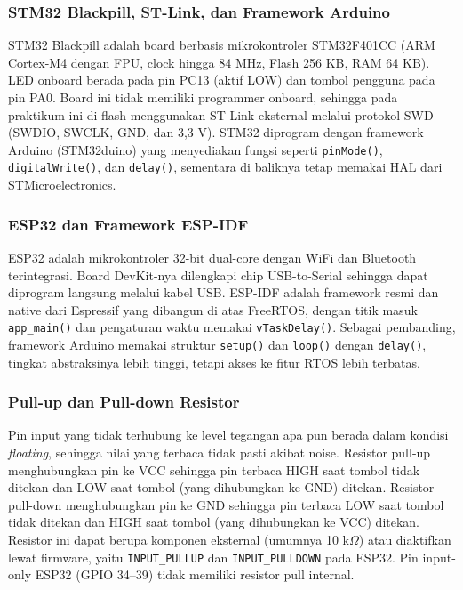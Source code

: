\subsubsection{STM32 Blackpill, ST-Link, dan Framework Arduino}
STM32 Blackpill adalah board berbasis mikrokontroler STM32F401CC (ARM Cortex-M4 dengan FPU, clock hingga 84 MHz, Flash 256 KB, RAM 64 KB). LED onboard berada pada pin PC13 (aktif LOW) dan tombol pengguna pada pin PA0. Board ini tidak memiliki programmer onboard, sehingga pada praktikum ini di-flash menggunakan ST-Link eksternal melalui protokol SWD (SWDIO, SWCLK, GND, dan 3,3 V). STM32 diprogram dengan framework Arduino (STM32duino) yang menyediakan fungsi seperti \texttt{pinMode()}, \texttt{digitalWrite()}, dan \texttt{delay()}, sementara di baliknya tetap memakai HAL dari STMicroelectronics.

\subsubsection{ESP32 dan Framework ESP-IDF}
ESP32 adalah mikrokontroler 32-bit dual-core dengan WiFi dan Bluetooth terintegrasi. Board DevKit-nya dilengkapi chip USB-to-Serial sehingga dapat diprogram langsung melalui kabel USB. ESP-IDF adalah framework resmi dan native dari Espressif yang dibangun di atas FreeRTOS, dengan titik masuk \texttt{app\_main()} dan pengaturan waktu memakai \texttt{vTaskDelay()}. Sebagai pembanding, framework Arduino memakai struktur \texttt{setup()} dan \texttt{loop()} dengan \texttt{delay()}, tingkat abstraksinya lebih tinggi, tetapi akses ke fitur RTOS lebih terbatas.

\subsubsection{Pull-up dan Pull-down Resistor}
Pin input yang tidak terhubung ke level tegangan apa pun berada dalam kondisi \emph{floating}, sehingga nilai yang terbaca tidak pasti akibat noise. Resistor pull-up menghubungkan pin ke VCC sehingga pin terbaca HIGH saat tombol tidak ditekan dan LOW saat tombol (yang dihubungkan ke GND) ditekan. Resistor pull-down menghubungkan pin ke GND sehingga pin terbaca LOW saat tombol tidak ditekan dan HIGH saat tombol (yang dihubungkan ke VCC) ditekan. Resistor ini dapat berupa komponen eksternal (umumnya 10 k$\Omega$) atau diaktifkan lewat firmware, yaitu \texttt{INPUT\_PULLUP} dan \texttt{INPUT\_PULLDOWN} pada ESP32. Pin input-only ESP32 (GPIO 34--39) tidak memiliki resistor pull internal.

